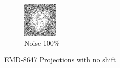 \documentclass{report}
\begin{document}
\begin{figure}[h]
\begin{subfigure}{.28\textwidth}
\includegraphics[width=0.8\linewidth]{Emd_8647_proj1_noise_100.jpg}
\captionsetup{justification=centering}
\caption{ Noise 100\%}
\end{subfigure}
\caption{EMD-8647 Projections with no shift}
\label{fig:EMD-8647 Projections: Noisy}
\end{figure}
\end{document}
